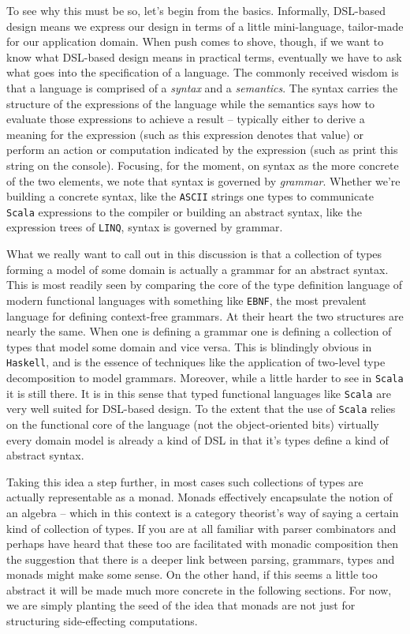 To see why this must be so, let's begin from the basics. Informally,
DSL-based design means we express our design in terms of a little
mini-language, tailor-made for our application domain. When push
comes to shove, though, if we want to know what DSL-based design means
in practical terms, eventually we have to ask what goes into the
specification of a language. The commonly received wisdom is that a
language is comprised of a \emph{syntax} and a \emph{semantics}. The
syntax carries the structure of the expressions of the language while
the semantics says how to evaluate those expressions to achieve a
result -- typically either to derive a meaning for the expression
(such as this expression denotes that value) or perform an action or
computation indicated by the expression (such as print this string on
the console). Focusing, for the moment, on syntax as the more concrete
of the two elements, we note that syntax is governed by
\emph{grammar}. Whether we're building a concrete syntax, like the
\texttt{ASCII} strings one types to communicate \texttt{Scala}
expressions to the compiler or building an abstract syntax, like the
expression trees of \texttt{LINQ}, syntax is governed by grammar.

What we really want to call out in this discussion is that a
collection of types forming a model of some domain is actually a
grammar for an abstract syntax. This is most readily seen by comparing
the core of the type definition language of modern functional
languages with something like \texttt{EBNF}, the most prevalent
language for defining context-free grammars. At their heart the two
structures are nearly the same. When one is defining a grammar one is
defining a collection of types that model some domain and vice
versa. This is blindingly obvious in \texttt{Haskell}, and is the
essence of techniques like the application of two-level type
decomposition to model grammars. Moreover, while a little harder to
see in \texttt{Scala} it is still there. It is in this sense that
typed functional languages like \texttt{Scala} are very well suited
for DSL-based design. To the extent that the use of \texttt{Scala}
relies on the functional core of the language (not the object-oriented
bits) virtually every domain model is already a kind of DSL in that
it's types define a kind of abstract syntax.

Taking this idea a step further, in most cases such collections of
types are actually representable as a monad. Monads effectively
encapsulate the notion of an algebra -- which in this context is a
category theorist's way of saying a certain kind of collection of
types. If you are at all familiar with parser combinators and perhaps
have heard that these too are facilitated with monadic composition
then the suggestion that there is a deeper link between parsing,
grammars, types and monads might make some sense. On the other hand,
if this seems a little too abstract it will be made much more concrete
in the following sections. For now, we are simply planting the seed of
the idea that monads are not just for structuring side-effecting
computations.
